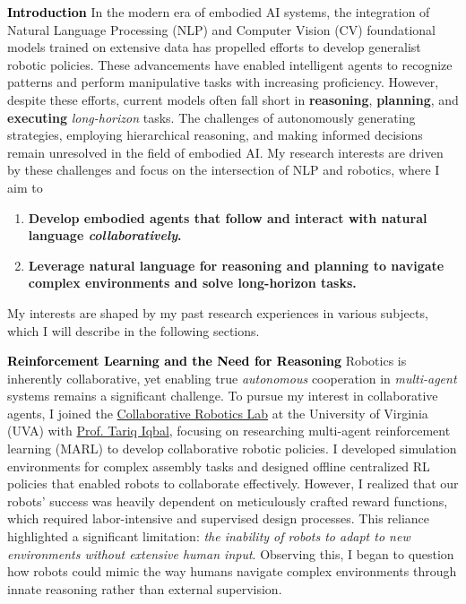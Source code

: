 \documentclass[10pt]{article}
\newcommand{\statement}[1]{\medskip\noindent
  \textcolor{black}{\textbf{#1}}\space
}
\begin{document}
\statement{Introduction} In the modern era of embodied AI systems, the integration of Natural Language Processing (NLP) and Computer Vision (CV) foundational models trained on extensive data has propelled efforts to develop generalist robotic policies. These advancements have enabled intelligent agents to recognize patterns and perform manipulative tasks with increasing proficiency. However, despite these efforts, current models often fall short in \textbf{reasoning}, \textbf{planning}, and \textbf{executing} \textit{long-horizon} tasks. The challenges of autonomously generating strategies, employing hierarchical reasoning, and making informed decisions remain unresolved in the field of embodied AI. My research interests are driven by these challenges and focus on the intersection of NLP and robotics, where I aim to
\begin{enumerate}[label=(\arabic*), itemindent=0pt, itemsep=0pt, parsep=0pt, nosep]
  \item \textbf{Develop embodied agents that follow and interact with natural language \textit{collaboratively}.}
  \item \textbf{Leverage natural language for reasoning and planning to navigate complex environments and solve long-horizon tasks.}
\end{enumerate}
My interests are shaped by my past research experiences in various subjects, which I will describe in the following sections.

\statement{Reinforcement Learning and the Need for Reasoning} Robotics is inherently collaborative, yet enabling true \textit{autonomous} cooperation in \textit{multi-agent} systems remains a significant challenge. To pursue my interest in collaborative agents, I joined the \href{https://www.collabrobotics.com/}{Collaborative Robotics Lab} at the University of Virginia (UVA) with  \href{https://www.tiqbal.com/}{Prof. Tariq Iqbal}, focusing on researching multi-agent reinforcement learning (MARL) to develop collaborative robotic policies. I developed simulation environments for complex assembly tasks and designed offline centralized RL policies that enabled robots to collaborate effectively. However, I realized that our robots' success was heavily dependent on meticulously crafted reward functions, which required labor-intensive and supervised design processes. This reliance highlighted a significant limitation: \textit{the inability of robots to adapt to new environments without extensive human input}. Observing this, I began to question how robots could mimic the way humans navigate complex environments through innate reasoning rather than external supervision.
\end{document}
